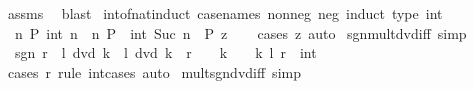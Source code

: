 \begin{isabellebody}
\ assms{\isacharparenleft}{\kern0pt}{}{\isacharparenright}{\kern0pt}\ \isamarkupfalse%
\ blast\isanewline
{}\isamarkupfalse%
%
\endisatagproof
{\isafoldproof}%
%
\isadelimproof
\isanewline
%
\endisadelimproof
\isanewline
{}\isamarkupfalse%
\ int{\isacharunderscore}{\kern0pt}of{\isacharunderscore}{\kern0pt}nat{\isacharunderscore}{\kern0pt}induct\ {\isacharbrackleft}{\kern0pt}case{\isacharunderscore}{\kern0pt}names\ nonneg\ neg{\isacharcomma}{\kern0pt}\ induct\ type{\isacharcolon}{\kern0pt}\ int{\isacharbrackright}{\kern0pt}{\isacharcolon}{\kern0pt}\isanewline
\ \ {\isachardoublequoteopen}{\isacharparenleft}{\kern0pt}{\isasymAnd}n{\isachardot}{\kern0pt}\ P\ {\isacharparenleft}{\kern0pt}int\ n{\isacharparenright}{\kern0pt}{\isacharparenright}{\kern0pt}\ {\isasymLongrightarrow}\ {\isacharparenleft}{\kern0pt}{\isasymAnd}n{\isachardot}{\kern0pt}\ P\ {\isacharparenleft}{\kern0pt}{\isacharminus}{\kern0pt}\ {\isacharparenleft}{\kern0pt}int\ {\isacharparenleft}{\kern0pt}Suc\ n{\isacharparenright}{\kern0pt}{\isacharparenright}{\kern0pt}{\isacharparenright}{\kern0pt}{\isacharparenright}{\kern0pt}\ {\isasymLongrightarrow}\ P\ z{\isachardoublequoteclose}\isanewline
%
\isadelimproof
\ \ %
\endisadelimproof
%
\isatagproof
{}\isamarkupfalse%
\ {\isacharparenleft}{\kern0pt}cases\ z{\isacharparenright}{\kern0pt}\ auto%
\endisatagproof
{\isafoldproof}%
%
\isadelimproof
\isanewline
%
\endisadelimproof
\isanewline
{}\isamarkupfalse%
\ sgn{\isacharunderscore}{\kern0pt}mult{\isacharunderscore}{\kern0pt}dvd{\isacharunderscore}{\kern0pt}iff\ {\isacharbrackleft}{\kern0pt}simp{\isacharbrackright}{\kern0pt}{\isacharcolon}{\kern0pt}\isanewline
\ \ {\isachardoublequoteopen}sgn\ r\ {\isacharasterisk}{\kern0pt}\ l\ dvd\ k\ {\isasymlongleftrightarrow}\ l\ dvd\ k\ {\isasymand}\ {\isacharparenleft}{\kern0pt}r\ {\isacharequal}{\kern0pt}\ {}\ {\isasymlongrightarrow}\ k\ {\isacharequal}{\kern0pt}\ {}{\isacharparenright}{\kern0pt}{\isachardoublequoteclose}\ \ k\ l\ r\ {\isacharcolon}{\kern0pt}{\isacharcolon}{\kern0pt}\ int\isanewline
%
\isadelimproof
\ \ %
\endisadelimproof
%
\isatagproof
{}\isamarkupfalse%
\ {\isacharparenleft}{\kern0pt}cases\ r\ rule{\isacharcolon}{\kern0pt}\ int{\isacharunderscore}{\kern0pt}cases{}{\isacharparenright}{\kern0pt}\ auto%
\endisatagproof
{\isafoldproof}%
%
\isadelimproof
\isanewline
%
\endisadelimproof
\isanewline
{}\isamarkupfalse%
\ mult{\isacharunderscore}{\kern0pt}sgn{\isacharunderscore}{\kern0pt}dvd{\isacharunderscore}{\kern0pt}iff\ {\isacharbrackleft}{\kern0pt}simp{\isacharbrackright}{\kern0pt}{\isacharcolon}{\kern0pt}\isanewline

\end{isabellebody}
